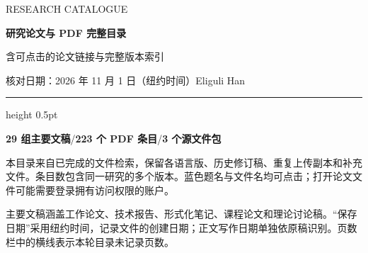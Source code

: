 \documentclass[UTF8,fontset=fandol,10pt,a4paper]{ctexart}
\begin{document}
{\color{Accent}\fontsize{9}{12}\selectfont RESEARCH CATALOGUE\par}
\vspace{2mm}
{\fontsize{24}{30}\selectfont\bfseries\color{Ink}研究论文与 PDF 完整目录\par}
{\fontsize{11}{15}\selectfont\color{Muted}含可点击的论文链接与完整版本索引\par}
\vspace{3mm}
{\small\color{Muted}核对日期：2026 年 11 月 1 日（纽约时间）\hfill Eliguli Han}
\vspace{3mm}
\hrule height 0.5pt
\vspace{3mm}
\colorbox{Pale}{\parbox{\dimexpr\linewidth-2\fboxsep\relax}{\vspace{2mm}\centering\textbf{29 组主要文稿}\quad\textcolor{Muted}{/}\quad\textbf{223 个 PDF 条目}\quad\textcolor{Muted}{/}\quad\textbf{3 个源文件包}\vspace{2mm}}}

{\small 本目录来自已完成的文件检索，保留各语言版、历史修订稿、重复上传副本和补充文件。条目数包含同一研究的多个版本。蓝色题名与文件名均可点击；打开论文文件可能需要登录拥有访问权限的账户。}

{\small 主要文稿涵盖工作论文、技术报告、形式化笔记、课程论文和理论讨论稿。“保存日期”采用纽约时间，记录文件的创建日期；正文写作日期单独依原稿识别。页数栏中的横线表示本轮目录未记录页数。}
\end{document}
